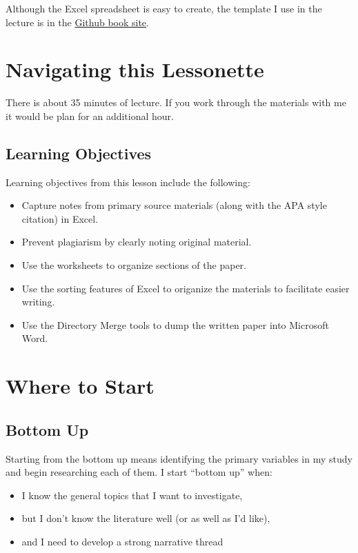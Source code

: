 \documentclass[
  english,
]{book}
\providecommand{\tightlist}{%
  \setlength{\itemsep}{0pt}\setlength{\parskip}{0pt}}
\begin{document}
Although the Excel spreadsheet is easy to create, the template I use in the lecture is in the \href{https://github.com/lhbikos/ReC_Topics}{Github book site}.

\hypertarget{navigating-this-lessonette-2}{%
\section{Navigating this Lessonette}\label{navigating-this-lessonette-2}}

There is about 35 minutes of lecture. If you work through the materials with me it would be plan for an additional hour.

\hypertarget{learning-objectives-9}{%
\subsection{Learning Objectives}\label{learning-objectives-9}}

Learning objectives from this lesson include the following:

\begin{itemize}
\tightlist
\item
  Capture notes from primary source materials (along with the APA style citation) in Excel.
\item
  Prevent plagiarism by clearly noting original material.
\item
  Use the worksheets to organize sections of the paper.
\item
  Use the sorting features of Excel to origanize the materials to facilitate easier writing.
\item
  Use the Directory Merge tools to dump the written paper into Microsoft Word.
\end{itemize}

\hypertarget{where-to-start}{%
\section{Where to Start}\label{where-to-start}}

\hypertarget{bottom-up}{%
\subsection{Bottom Up}\label{bottom-up}}

Starting from the bottom up means identifying the primary variables in my study and begin researching each of them. I start ``bottom up'' when:

\begin{itemize}
\tightlist
\item
  I know the general topics that I want to investigate,
\item
  but I don't know the literature well (or as well as I'd like),
\item
  and I need to develop a strong narrative thread
\end{itemize}
\end{document}
